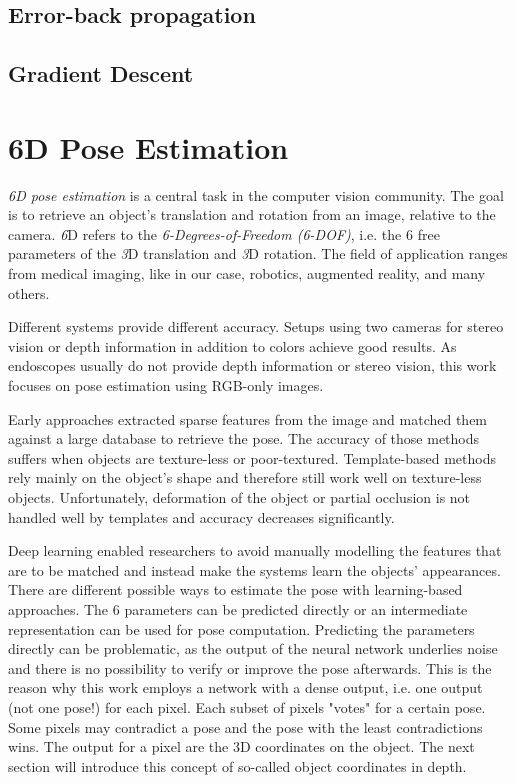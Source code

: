 \subsection{Error-back propagation} \label{section:backpropagation}

\subsection{Gradient Descent}

\section{6D Pose Estimation}

\textit{6D pose estimation} is a central task in the computer vision community. The goal is to retrieve an object's translation and rotation from an image, relative to the camera. \textit{6}D refers to the \textit{6-Degrees-of-Freedom (6-DOF)}, i.e. the 6 free parameters of the \textit{3}D translation and \textit{3}D rotation. The field of application ranges from medical imaging, like in our case, robotics, augmented reality, and many others. 

Different systems provide different accuracy. Setups using two cameras for stereo vision or depth information in addition to colors achieve good results. As endoscopes usually do not provide depth information or stereo vision, this work focuses on pose estimation using RGB-only images. 

Early approaches extracted sparse features from the image and matched them against a large database to retrieve the pose. The accuracy of those methods suffers when objects are texture-less or poor-textured. Template-based methods rely mainly on the object's shape and therefore still work well on texture-less objects. Unfortunately, deformation of the object or partial occlusion is not handled well by templates and accuracy decreases significantly.

Deep learning enabled researchers to avoid manually modelling the features that are to be matched and instead make the systems learn the objects' appearances. There are different possible ways to estimate the pose with learning-based approaches. The 6 parameters can be predicted directly or an intermediate representation can be used for pose computation. Predicting the parameters directly can be problematic, as the output of the neural network underlies noise and there is no possibility to verify or improve the pose afterwards. This is the reason why this work employs a network with a dense output, i.e. one output (not one pose!) for each pixel. Each subset of pixels "votes" for a certain pose. Some pixels may contradict a pose and the pose with the least contradictions wins. The output for a pixel are the 3D coordinates on the object. The next section will introduce this concept of so-called object coordinates in depth.

